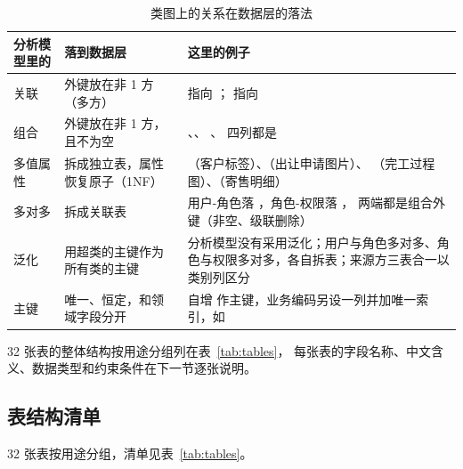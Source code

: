 \begin{table}[H]
\centering
\small
\caption{类图上的关系在数据层的落法}
\label{tab:map-rules}
\begin{tabularx}{\textwidth}{@{}L{3.4cm} L{4.0cm} Y@{}}
\toprule
分析模型里的 & 落到数据层 & 这里的例子 \\
\midrule
关联 & 外键放在非 1 方（多方） &
 指向 ；
 指向  \\
组合 & 外键放在非 1 方，且不为空 &
、、
、 四列都是  \\
多值属性 & 拆成独立表，属性恢复原子（1NF） &
（客户标签）、（出让申请图片）、
（完工过程图）、（寄售明细） \\
多对多 & 拆成关联表 &
用户-角色落 ，角色-权限落 ，
两端都是组合外键（非空、级联删除） \\
泛化 & 用超类的主键作为所有类的主键 &
分析模型没有采用泛化；用户与角色多对多、角色与权限多对多，各自拆表；来源方三表合一以类别列区分 \\
主键 & 唯一、恒定，和领域字段分开 &
自增  作主键，业务编码另设一列并加唯一索引，如  \\
\bottomrule
\end{tabularx}
\end{table}

32 张表的整体结构按用途分组列在表~\ref{tab:tables}，
每张表的字段名称、中文含义、数据类型和约束条件在下一节逐张说明。

\subsection{表结构清单}

32 张表按用途分组，清单见表~\ref{tab:tables}。

